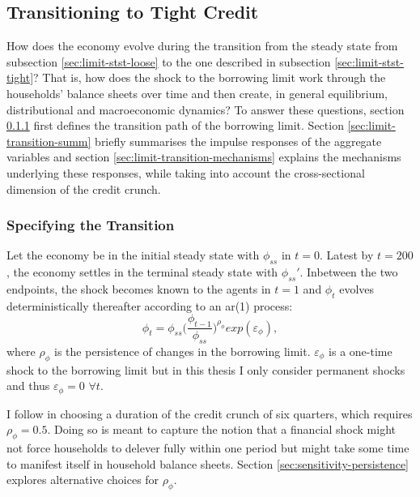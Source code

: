 \documentclass[12pt]{article} %
\numberwithin{equation}{section} %
\numberwithin{figure}{section}
\numberwithin{table}{section}
\begin{document}
\subsection{Transitioning to Tight Credit}
\label{sec:limit-transition}

How does the economy evolve during the transition from the steady state from subsection \ref{sec:limit-stst-loose} to the one described in subsection \ref{sec:limit-stst-tight}? That is, how does the shock to the borrowing limit work through the households' balance sheets over time and then create, in general equilibrium, distributional and macroeconomic dynamics? To answer these questions, section \ref{sec:limit-transition-specific} first defines the transition path of the borrowing limit. Section \ref{sec:limit-transition-summ} briefly summarises the impulse responses of the aggregate variables and section \ref{sec:limit-transition-mechanisms} explains the mechanisms underlying these responses, while taking into account the cross-sectional dimension of the credit crunch. 

\subsubsection{Specifying the Transition}
\label{sec:limit-transition-specific}

Let the economy be in the initial steady state with $\phi_{ss}$ in $t=0$. Latest by $t=200$, the economy settles in the terminal steady state with $\phi_{ss}'$. Inbetween the two endpoints, the shock becomes known to the agents in $t=1$ and $\phi_t$ evolves deterministically thereafter according to an \Gls{ar}(1) process:
\begin{equation}
    \phi_t = \phi_{ss} \Bigg( \frac{\phi_{t-1}}{\phi_{ss}} \Bigg)^{\rho_{\phi}} exp(\varepsilon_{\phi}), \label{eq:borrowing-limit-process}
\end{equation}
where $\rho_{\phi}$ is the persistence of changes in the borrowing limit. $\varepsilon_{\phi}$ is a one-time shock to the borrowing limit but in this thesis I only consider permanent shocks and thus $\varepsilon_{\phi} = 0$ $\forall t$.

I follow \textcite{gl2017} in choosing a duration of the credit crunch of six quarters, which requires $\rho_{\phi} = 0.5$. Doing so is meant to capture the notion that a financial shock might not force households to delever fully within one period but might take some time to manifest itself in household balance sheets. Section \ref{sec:sensitivity-persistence} explores alternative choices for $\rho_{\phi}$.
\end{document}
